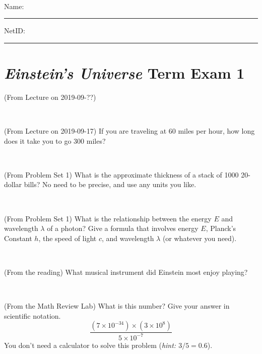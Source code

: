 \documentclass[12pt, letterpaper]{article}
\begin{document}
\vfill ~


\cleardoublepage



\noindent
Name: \rule[-1ex]{0.60\textwidth}{0.1pt}
NetID: \rule[-1ex]{0.20\textwidth}{0.1pt}

\section*{\textsl{Einstein's Universe} Term Exam 1}
\setcounter{problem}{1}


\begin{problem} (From Lecture on 2019-09-??)
\end{problem}


\vfill ~

\begin{problem} (From Lecture on 2019-09-17)
If you are traveling at 60 miles per hour, how long does
it take you to go 300 miles?
\end{problem}


\vfill ~

\begin{problem} (From Problem Set 1)
What is the approximate thickness of a stack of 1000 20-dollar bills?
No need to be precise, and use any units you like.
\end{problem}


\vfill ~

\begin{problem} (From Problem Set 1)
What is the relationship between the energy $E$ and wavelength
$\lambda$ of a photon? Give a formula that involves energy $E$,
Planck's Constant $h$, the speed of light $c$, and wavelength
$\lambda$ (or whatever you need).
\end{problem}

\vfill ~


\clearpage


\begin{problem} (From the reading)
What musical instrument did Einstein most enjoy playing?
\end{problem}


\vfill ~

\begin{problem} (From the Math Review Lab)
What is this number? Give your answer in scientific notation.
$$
\frac{(7\times10^{-34})\times(3\times10^8)}{5\times10^{-7}}
$$
You don't need a calculator to solve this problem (\textit{hint: $3/5=0.6$}).
\end{problem}
\end{document}
